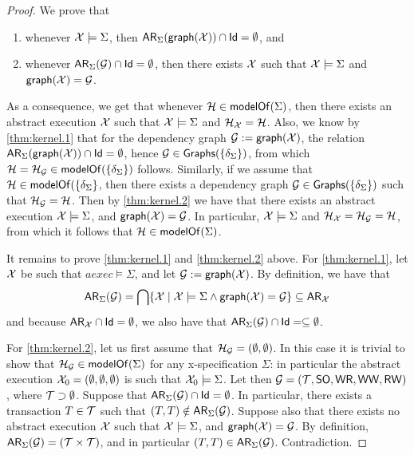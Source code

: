 \documentclass[a4paper,UKenglish]{article}%
\theoremstyle{plain}
\begin{document}
\begin{proof}
We prove that 
\begin{enumerate} 
\item\label{thm:kernel.1} whenever $\mathcal{X} \models \Sigma$, then ${\sf{AR}}_{\Sigma}(\mathsf{graph}(\mathcal{X}))\cap \mathsf{Id} = \emptyset$, and 
\item\label{thm:kernel.2} whenever ${\sf{AR}}_{\Sigma}(\mathcal{G}) \cap \mathsf{Id} = \emptyset$, then there exists $\mathcal{X}$ such that 
$\mathcal{X} \models \Sigma$ and $\mathsf{graph}(\mathcal{X}) = \mathcal{G}$. 
\end{enumerate}
As a consequence, we get that whenever $\mathcal{H} \in \mathsf{modelOf}(\Sigma)$, then there exists an abstract execution 
$\mathcal{X}$ such that $\mathcal{X} \models \Sigma$ and $\mathcal{H}_{\mathcal{X}} = \mathcal{H}$. Also, we know by \eqref{thm:kernel.1} 
that for the dependency  graph $\mathcal{G} := \mathsf{graph}(\mathcal{X})$, the relation ${\sf{AR}}_{\Sigma}(\mathsf{graph}(\mathcal{X})) \cap \mathsf{Id} = \emptyset$, 
hence $\mathcal{G} \in \mathsf{Graphs}(\{\delta_{\Sigma}\})$, from which $\mathcal{H} = \mathcal{H}_{\mathcal{G}} \in \mathsf{modelOf}(\{\delta_{\Sigma}\})$ follows. 
Similarly, if we assume that $\mathcal{H} \in \mathsf{modelOf}(\{\delta_{\Sigma}\}$, then there exists a dependency graph
$\mathcal{G} \in \mathsf{Graphs}(\{\delta_{\Sigma}\})$ such that $\mathcal{H}_{\mathcal{G}} = \mathcal{H}$. Then by \eqref{thm:kernel.2} we have 
that there exists an abstract execution $\mathcal{X} \models \Sigma$, and $\mathsf{graph}(\mathcal{X}) = \mathcal{G}$. In particular, 
$\mathcal{X} \models \Sigma$ and $\mathcal{H}_{\mathcal{X}} = \mathcal{H}_{\mathcal{G}} = \mathcal{H}$, from which it follows that $\mathcal{H} \in \mathsf{modelOf}(\Sigma)$.

It remains to prove \eqref{thm:kernel.1} and \eqref{thm:kernel.2} above. For \eqref{thm:kernel.1}, let $\mathcal{X}$ be 
such that $aexec \models \Sigma$, and let $\mathcal{G} := \mathsf{graph}(\mathcal{X})$. By definition, we have 
that 
\[
{\sf{AR}}_{\Sigma}(\mathcal{G}) = \bigcap \{ \mathcal{X} \mid \mathcal{X} \models \Sigma \wedge \mathsf{graph}(\mathcal{X}) = \mathcal{G}\} \subseteq 
{\sf{AR}}_{\mathcal{X}}
\]
and because ${\sf{AR}}_{\mathcal{X}} \cap \mathsf{Id} = \emptyset$, we also have that ${\sf{AR}}_{\Sigma}(\mathcal{G}) \cap \mathsf{Id} = \subseteq \emptyset$. 

For \eqref{thm:kernel.2}, let us first assume that $\mathcal{H}_{\mathcal{G}} = (\emptyset, \emptyset)$. In this case it is trivial to 
show that $\mathcal{H}_{\mathcal{G}} \in \mathsf{modelOf}(\Sigma)$ for any x-specification $\Sigma$: in particular 
the abstract execution $\mathcal{X}_0 = (\emptyset, \emptyset, \emptyset)$ is such that 
$\mathcal{X}_0 \models \Sigma$. 
Let then $\mathcal{G} = (\mathcal{T}, {\sf{SO}}, {\mathsf{WR}}, {\mathsf{WW}}, {\mathsf{RW}})$, 
where $\mathcal{T} \supset \emptyset$. Suppose that ${\sf{AR}}_{\Sigma}(\mathcal{G}) \cap \mathsf{Id} = \emptyset$. In particular, there exists 
a transaction $T \in \mathcal{T}$ such that $(T,T) \notin {\sf{AR}}_{\Sigma}(\mathcal{G})$. Suppose also that there exists no abstract execution 
$\mathcal{X}$ such that $\mathcal{X} \models \Sigma$, and $\mathsf{graph}(\mathcal{X}) = \mathcal{G}$. By definition, ${\sf{AR}}_{\Sigma}(\mathcal{G}) = (\mathcal{T} \times \mathcal{T})$, 
and in particular $(T,T) \in {\sf{AR}}_{\Sigma}(\mathcal{G})$. Contradiction.
\end{proof}
\end{document}
